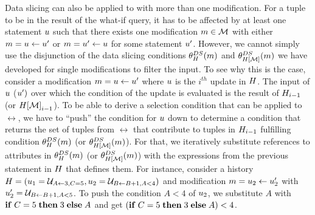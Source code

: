 Data slicing can also be applied to \abbrHWs with more than one modification. For a tuple to be in the result of the what-if query, it has to be affected by at least one statement $u$ such that there exists one modification $m \in \mathcal{M}$ with either $m = u \gets u'$ or $m = u' \gets u$ for some statement $u'$. However, we cannot simply use the disjunction of the data slicing conditions $\theta_{H}^{DS}(m)$ and $\theta_{H[\mathcal{M}]}^{DS}(m)$ we have developed for single modifications to filter the input. To see why this is the case, consider a modification $m = u \gets u'$ where $u$ is the $i^{th}$ update in $H$. The
input of $u$ ($u')$ over which the condition of the update is evaluated is the result of $H_{i-1}$ (or ${H[\mathcal{M}]}_{i-1}$). To be able to derive a selection condition that can be applied to $\rel$, we have to ``push'' the condition for $u$ down to determine a condition that returns the set of tuples from $\rel$ that contribute to tuples in $H_{i-1}$ fulfilling condition $\theta_{H}^{DS}(m)$ (or $\theta_{H[\mathcal{M}]}^{DS}(m)$).
For that, we iteratively substitute references to attributes in $\theta_{H}^{DS}(m)$ (or $\theta_{H[\mathcal{M}]}^{DS}(m)$) with the expressions from the previous statement in $H$ that defines them. For instance, consider a history $H = (u_1 = \mathcal{U}_{A \gets 3,C = 5}, u_2 = \mathcal{U}_{B \gets B + 1,A < 4})$ and modification $m = u_2 \gets u_2'$ with $u_2' = \mathcal{U}_{B \gets B + 1,A < 5}$. To push the condition $A < 4$ of $u_2$, we substitute $A$ with $\mathbf{if}\thickspace C=5 \thickspace \mathbf{then} \thickspace 3 \thickspace \mathbf{else} \thickspace A$ and get $(\mathbf{if}\thickspace C=5 \thickspace \mathbf{then} \thickspace 3 \thickspace \mathbf{else} \thickspace A) < 4$.


